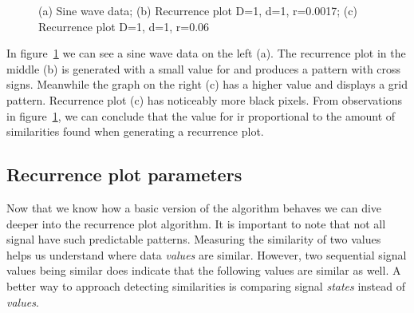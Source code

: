 \documentclass[a4paper,12pt,fleqn]{article}
\begin{document}
\begin{figure}[ht!]
  \hspace{\fill}
  \hspace{\fill}
  \caption{\label{fig:theory_sin}(a) Sine wave data; (b) Recurrence plot D=1, d=1, r=0.0017; (c) Recurrence plot D=1, d=1, r=0.06}
\end{figure}
In figure~\ref{fig:theory_sin} we can see a sine wave data on the left (a). 
The recurrence plot in the middle (b) is generated with a small value for  and produces a pattern with cross signs.
Meanwhile the graph on the right (c) has a higher  value and displays a grid pattern.
Recurrence plot (c) has noticeably more black pixels.
From observations in figure~\ref{fig:theory_sin}, we can conclude that the value for  ir proportional to the amount of similarities found when generating a recurrence plot.

\subsection{Recurrence plot parameters}
Now that we know how a basic version of the algorithm behaves we can dive deeper into the recurrence plot algorithm.
It is important to note that not all signal have such predictable patterns.
Measuring the similarity of two values helps us understand where data \emph{values} are similar.
However, two sequential signal values being similar does indicate that the following values are similar as well.
A better way to approach detecting similarities is comparing signal \emph{states} instead of \emph{values}.
\end{document}
